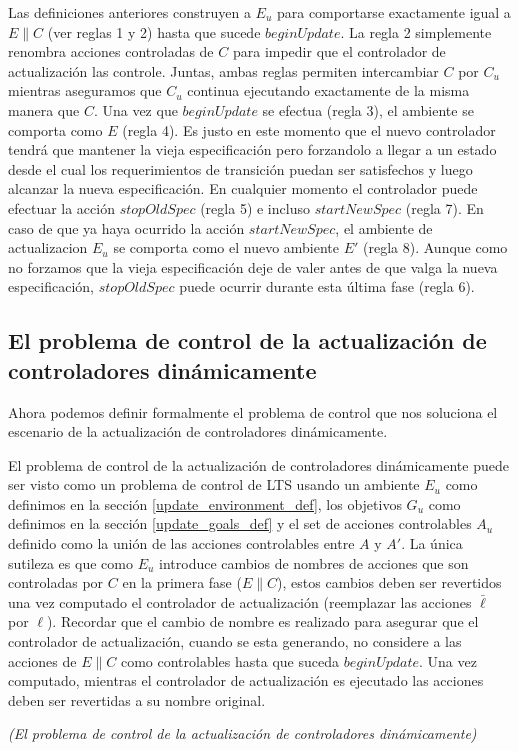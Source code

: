Las definiciones anteriores construyen a $E_u$ para comportarse exactamente igual a $E\|C$ (ver reglas 1 y 2) hasta que
sucede $beginUpdate$. La regla 2 simplemente renombra acciones controladas de $C$ para impedir que el controlador de
actualización las controle. Juntas, ambas reglas permiten intercambiar $C$ por $C_u$ mientras aseguramos que $C_u$
continua ejecutando exactamente de la misma manera que $C$. Una vez que $beginUpdate$ se efectua (regla 3), el ambiente
se comporta como $E$ (regla 4). Es justo en este momento que el nuevo controlador tendrá que mantener la vieja
especificación pero forzandolo a llegar a un estado desde el cual los requerimientos de transición puedan ser
satisfechos y luego alcanzar la nueva especificación. En cualquier momento el controlador puede efectuar la acción
$stopOldSpec$ (regla 5) e incluso $startNewSpec$ (regla 7). En caso de que ya haya ocurrido la acción $startNewSpec$, el
ambiente de actualizacion $E_u$ se comporta como el nuevo ambiente $E'$ (regla 8). Aunque como no forzamos que la
vieja especificación deje de valer antes de que valga la nueva especificación, $stopOldSpec$ puede ocurrir durante esta
última fase (regla 6).

\subsection{El problema de control de la actualización de controladores dinámicamente}

Ahora podemos definir formalmente el problema de control que nos soluciona el escenario de la actualización de
controladores dinámicamente.

El problema de control de la actualización de controladores dinámicamente puede ser visto como un problema de control de
LTS usando un ambiente $E_u$ como definimos en la sección \ref{update_environment_def}, los objetivos $G_u$ como
definimos en la sección \ref{update_goals_def} y el set de acciones controlables $A_u$ definido como la unión de las
acciones controlables entre $A$ y $A'$. La única sutileza es que como $E_u$ introduce cambios de nombres de acciones que
son controladas por $C$ en la primera fase ($E\|C$), estos cambios deben ser revertidos una vez computado el controlador
de actualización (reemplazar las acciones $\bar{\ell}$ por $\ell$). Recordar que el cambio de nombre es realizado para
asegurar que el controlador de actualización, cuando se esta generando, no considere a las acciones de $E\|C$ como
controlables hasta que suceda $beginUpdate$. Una vez computado, mientras el controlador de actualización es ejecutado
las acciones deben ser revertidas a su nombre original.

\begin{nahaDef}
\emph{(El problema de control de la actualización de controladores dinámicamente)}
\end{nahaDef}



